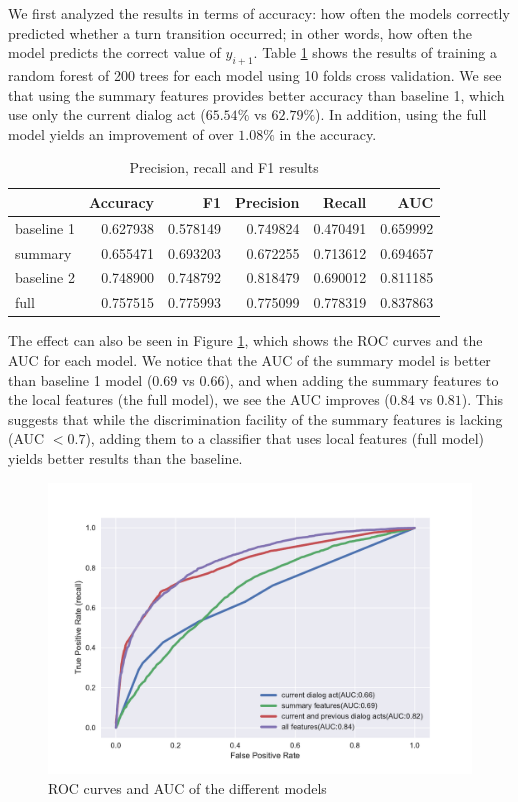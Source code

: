 We first analyzed the results in terms of accuracy: how often the models correctly predicted whether a turn transition occurred; in other words, how often the model predicts the correct value of $y_{i+1}$.
%
Table \ref{table:result} shows the results of training a random forest of 200 trees for each model using 10 folds cross validation. We see that using the summary features provides better accuracy than baseline 1, which use only the current dialog act ($65.54\%$ vs $62.79\%$). In addition, using the full model yields an improvement of over $1.08\%$ in the accuracy.
%
\begin{table}[ht!]
\begin{center}
\begin{tabular}{lrrrrr}
\toprule
{} &  Accuracy &        F1 &  Precision &    Recall &   AUC \\
\midrule
baseline 1 &  0.627938 &  0.578149 &   0.749824 &  0.470491 &  0.659992 \\
summary    &  0.655471 &  0.693203 &   0.672255 &  0.713612 &  0.694657 \\
baseline 2 &  0.748900 &  0.748792 &   0.818479 &  0.690012 &  0.811185 \\
full       &  0.757515 &  0.775993 &   0.775099 &  0.778319 &  0.837863 \\
\bottomrule
\end{tabular}
\end{center}
\caption{Precision, recall and F1 results }
\label{table:result}
\end{table}


The effect can also be seen in Figure \ref{auc}, which shows the ROC curves and the AUC for each
model. We notice that the AUC of the summary model is better than baseline 1 model ($0.69$ vs $0.66$), and when adding the summary features to the local features (the full model), we see the AUC improves ($0.84$ vs $0.81$). This suggests that while the discrimination facility of the summary features is lacking (AUC $<0.7$), adding them to a classifier that uses local features (full model) yields better results than the baseline.
%
 \begin{figure}[ht!]
 \centering
 \includegraphics[width=\textwidth]{../scikitlearn/figures/roc.pdf}\vspace{-1.5em}
 \caption{ROC curves and AUC of the different models \label{overflow}}
\label{auc}
 \end{figure}

